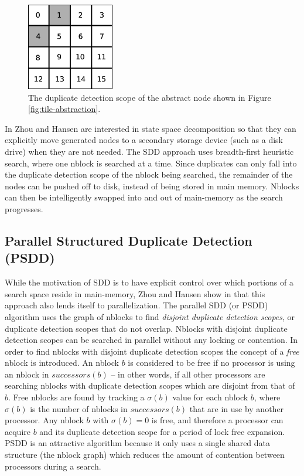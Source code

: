 \documentclass{article} \usepackage{aaai} \usepackage{graphicx}
\begin{document}
\begin{figure}[t]
\begin{center}
\includegraphics[width=1.5in]{images/duplicate-detection-scope.eps}
\caption{The duplicate detection scope of the abstract node shown in
  Figure \ref{fig:tile-abstraction}.}
\label{fig:duplicate-detection-scope}
\end{center}
\end{figure}

In \cite{zhou:sdd} Zhou and Hansen are interested in state space
decomposition so that they can explicitly move generated nodes to a
secondary storage device (such as a disk drive) when they are not
needed.  The SDD approach uses breadth-first heuristic search, where
one nblock is searched at a time.  Since duplicates can only fall into
the duplicate detection scope of the nblock being searched, the
remainder of the nodes can be pushed off to disk, instead of being
stored in main memory.  Nblocks can then be intelligently swapped into
and out of main-memory as the search progresses.

\subsection{Parallel Structured Duplicate Detection (PSDD)}

While the motivation of SDD is to have explicit control over which
portions of a search space reside in main-memory, Zhou and Hansen show
in \cite{zhou:psd} that this approach also lends itself to
parallelization.  The parallel SDD (or PSDD) algorithm uses the graph
of nblocks to find \emph{disjoint duplicate detection scopes}, or
duplicate detection scopes that do not overlap.  Nblocks with disjoint
duplicate detection scopes can be searched in parallel without any
locking or contention.  In order to find nblocks with disjoint
duplicate detection scopes the concept of a \emph{free} nblock is
introduced.  An nblock $b$ is considered to be free if no processor is
using an nblock in $successors(b)$ -- in other words, if all other
processors are searching nblocks with duplicate detection scopes which
are disjoint from that of $b$.  Free nblocks are found by tracking a
$\sigma(b)$ value for each nblock $b$, where $\sigma(b)$ is the number
of nblocks in $successors(b)$ that are in use by another processor.
Any nblock $b$ with $\sigma(b) = 0$ is free, and therefore a processor
can acquire $b$ and its duplicate detection scope for a period of lock
free expansion.  PSDD is an attractive algorithm because it only uses
a single shared data structure (the nblock graph) which reduces the
amount of contention between processors during a search.
\end{document}
